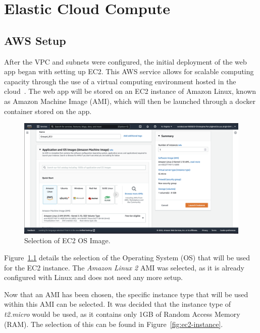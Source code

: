 \chapter{Elastic Cloud Compute}\label{ch:ec2}

\section{AWS Setup}\label{sec:aws-setup}

After the VPC and subnets were configured, the initial deployment of the web app began with setting up EC2.
This AWS service allows for scalable computing capacity through the use of a virtual computing environment hosted in the
cloud~\parencite{aws2022ec2}.
The web app will be stored on an EC2 instance of Amazon Linux, known as Amazon Machine Image (AMI), which will then be
launched through a docker container stored on the app.

\begin{figure}[!htbp]
    \centering
    \includegraphics[width=\textwidth]{resources/ec2/create-instance-application-and-os-images}
    \caption{Selection of EC2 OS Image.}
    \label{fig:ec2-os}
\end{figure}

Figure~\ref{fig:ec2-os} details the selection of the Operating System (OS) that will be used for the EC2 instance.
The \textit{Amazon Linux 2} AMI was selected, as it is already configured with Linux and does not need any more setup.

\clearpage
Now that an AMI has been chosen, the specific instance type that will be used within this AMI can be selected.
It was decided that the instance type of \textit{t2.micro} would be used, as it contains only 1GB of Random Access
Memory (RAM).
The selection of this can be found in Figure~\ref{fig:ec2-instance}.

